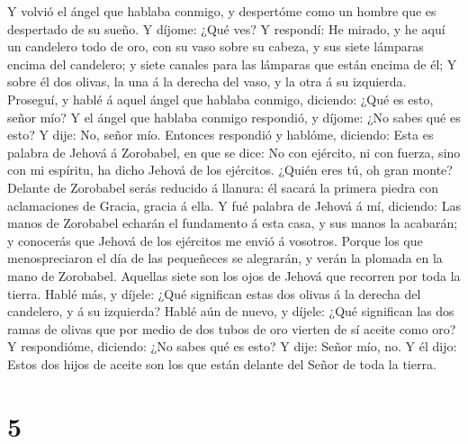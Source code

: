  Y volvió el ángel que hablaba conmigo, y despertóme como
un hombre que es despertado de su sueño.  Y díjome: ¿Qué
ves? Y respondí: He mirado, y he aquí un candelero todo de oro, con su
vaso sobre su cabeza, y sus siete lámparas encima del candelero; y siete
canales para las lámparas que están encima de él;  Y sobre
él dos olivas, la una á la derecha del vaso, y la otra á su izquierda.
 Proseguí, y hablé á aquel ángel que hablaba conmigo,
diciendo: ¿Qué es esto, señor mío?  Y el ángel que hablaba
conmigo respondió, y díjome: ¿No sabes qué es esto? Y dije: No, señor
mío.  Entonces respondió y hablóme, diciendo: Esta es
palabra de Jehová á Zorobabel, en que se dice: No con ejército, ni con
fuerza, sino con mi espíritu, ha dicho Jehová de los ejércitos.
 ¿Quién eres tú, oh gran monte? Delante de Zorobabel serás
reducido á llanura: él sacará la primera piedra con aclamaciones de
Gracia, gracia á ella.  Y fué palabra de Jehová á mí,
diciendo:  Las manos de Zorobabel echarán el fundamento á
esta casa, y sus manos la acabarán; y conocerás que Jehová de los
ejércitos me envió á vosotros.  Porque los que
menospreciaron el día de las pequeñeces se alegrarán, y verán la plomada
en la mano de Zorobabel. Aquellas siete son los ojos de Jehová que
recorren por toda la tierra.  Hablé más, y díjele: ¿Qué
significan estas dos olivas á la derecha del candelero, y á su
izquierda?  Hablé aún de nuevo, y díjele: ¿Qué significan
las dos ramas de olivas que por medio de dos tubos de oro vierten de sí
aceite como oro?  Y respondióme, diciendo: ¿No sabes qué
es esto? Y dije: Señor mío, no.  Y él dijo: Estos dos
hijos de aceite son los que están delante del Señor de toda la tierra.

\hypertarget{section-4}{%
\section{5}\label{section-4}}

